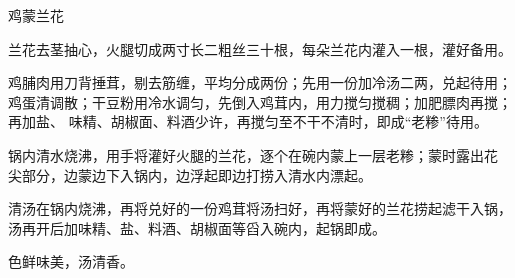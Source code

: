 %
%
%
%
%
%
%
\begin{recipe}{鸡蒙兰花}

\ingredients


\preparation

\step 兰花去茎抽心，火腿切成两寸长二粗丝三十根，每朵兰花内灌入一根，灌好备用。

\step 鸡脯肉用刀背捶茸，剔去筋缠，平均分成两份；先用一份加冷汤二两，兑起待用；
鸡蛋清调散；干豆粉用冷水调匀，先倒入鸡茸内，用力搅匀搅稠；加肥膘肉再搅；再加盐、
味精、胡椒面、料酒少许，再搅匀至不干不清时，即成“老糁”待用。

\step 锅内清水烧沸，用手将灌好火腿的兰花，逐个在碗内蒙上一层老糁；蒙时露出花
尖部分，边蒙边下入锅内，边浮起即边打捞入清水内漂起。

\step 清汤在锅内烧沸，再将兑好的一份鸡茸将汤扫好，再将蒙好的兰花捞起滤干入锅，
汤再开后加味精、盐、料酒、胡椒面等舀入碗内，起锅即成。

\features

色鲜味美，汤清香。

\end{recipe}

